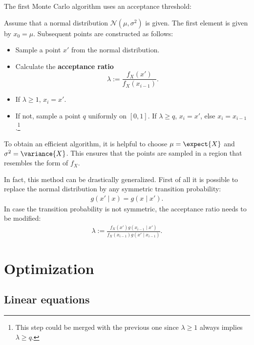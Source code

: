     The first Monte Carlo algorithm uses an acceptance threshold:
    \begin{method}
        Assume that a normal distribution $\mathcal{N}(\mu,\sigma^2)$ is given. The first element is given by $x_0=\mu$. Subsequent points are constructed as follows:
        \begin{itemize}
            \item Sample a point $x'$ from the normal distribution.
            \item Calculate the \textbf{acceptance ratio} \[\lambda := \frac{f_X(x')}{f_X(x_{i-1})}.\]
            \item If $\lambda\geq1$, $x_i=x'$.
            \item If not, sample a point $q$ uniformly on $[0,1]$. If $\lambda\geq q$, $x_i=x'$, else $x_i=x_{i-1}$.\footnote{This step could be merged with the previous one since $\lambda\geq1$ always implies $\lambda\geq q$.}
        \end{itemize}
        To obtain an efficient algorithm, it is helpful to choose $\mu=\expect{X}$ and $\sigma^2=\variance{X}$. This ensures that the points are sampled in a region that resembles the form of $f_X$.

        In fact, this method can be drastically generalized. First of all it is possible to replace the normal distribution by any symmetric transition probability:
        \begin{gather}
            g(x'\mid x) = g(x\mid x').
        \end{gather}
        In case the transition probability is not symmetric, the acceptance ratio needs to be modified:
        \begin{gather}
            \lambda := \frac{f_X(x')g(x_{i-1}\mid x')}{f_X(x_{i-1})g(x'\mid x_{i-1})}.
        \end{gather}
    \end{method}

\section{Optimization}
\subsection{Linear equations}

